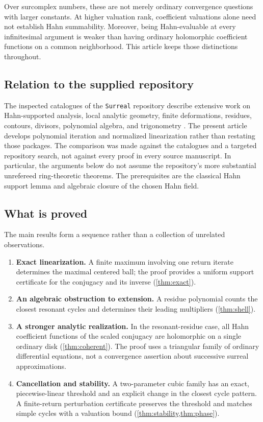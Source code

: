 \documentclass[11pt,letterpaper]{article}
\numberwithin{equation}{section}
\theoremstyle{plain}
\theoremstyle{definition}
\theoremstyle{remark}
\begin{document}
Over surcomplex numbers, these are not merely ordinary convergence questions
with larger constants. At higher valuation rank, coefficient valuations alone
need not establish Hahn summability. Moreover, being Hahn-evaluable at every
infinitesimal argument is weaker than having ordinary holomorphic coefficient
functions on a common neighborhood. This article keeps those distinctions
throughout.

\subsection{Relation to the supplied repository}

The inspected catalogues of the \texttt{Surreal} repository describe extensive
work on Hahn-supported analysis, local analytic geometry, finite deformations,
residues, contours, divisors, polynomial algebra, and trigonometry
\cite{repo}. The present article develops polynomial iteration and normalized
linearization rather than restating those packages. The comparison was made
against the catalogues and a targeted repository search, not against every
proof in every source manuscript. In particular, the arguments below do not
assume the repository's more substantial unrefereed ring-theoretic theorems.
The prerequisites are the classical Hahn support lemma and algebraic closure
of the chosen Hahn field.

\subsection{What is proved}

The main results form a sequence rather than a collection of unrelated
observations.
\begin{enumerate}[label=\arabic*.]
\item \textbf{Exact linearization.} A finite maximum involving one return
iterate determines the maximal centered ball; the proof provides a uniform
support certificate for the conjugacy and its inverse
(\cref{thm:exact}).
\item \textbf{An algebraic obstruction to extension.} A residue polynomial
counts the closest resonant cycles and determines their leading multipliers
(\cref{thm:shell}).
\item \textbf{A stronger analytic realization.} In the resonant-residue case,
all Hahn coefficient functions of the scaled conjugacy are holomorphic on a
single ordinary disk (\cref{thm:coherent}). The proof uses a triangular family
of ordinary differential equations, not a convergence assertion about
successive surreal approximations.
\item \textbf{Cancellation and stability.} A two-parameter cubic family has
an exact, piecewise-linear threshold and an explicit change in the closest
cycle pattern. A finite-return perturbation certificate preserves the
threshold and matches simple cycles with a valuation bound
(\cref{thm:stability,thm:phase}).
\end{enumerate}
\end{document}
